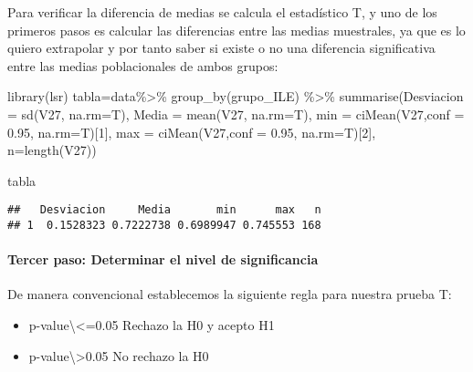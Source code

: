 \documentclass[
]{article}
\newenvironment{Shaded}{\begin{snugshade}}{\end{snugshade}}
\newcommand{\AttributeTok}[1]{\textcolor[rgb]{0.77,0.63,0.00}{#1}}
\newcommand{\DecValTok}[1]{\textcolor[rgb]{0.00,0.00,0.81}{#1}}
\newcommand{\FloatTok}[1]{\textcolor[rgb]{0.00,0.00,0.81}{#1}}
\newcommand{\FunctionTok}[1]{\textcolor[rgb]{0.00,0.00,0.00}{#1}}
\newcommand{\NormalTok}[1]{#1}
\newcommand{\OtherTok}[1]{\textcolor[rgb]{0.56,0.35,0.01}{#1}}
\newcommand{\SpecialCharTok}[1]{\textcolor[rgb]{0.00,0.00,0.00}{#1}}
\begin{document}
Para verificar la diferencia de medias se calcula el estadístico T, y
uno de los primeros pasos es calcular las diferencias entre las medias
muestrales, ya que es lo quiero extrapolar y por tanto saber si existe o
no una diferencia significativa entre las medias poblacionales de ambos
grupos:

\begin{Shaded}
\begin{Highlighting}[]
\FunctionTok{library}\NormalTok{(lsr)}
\NormalTok{tabla}\OtherTok{=}\NormalTok{data}\SpecialCharTok{\%\textgreater{}\%}
  \FunctionTok{group\_by}\NormalTok{(grupo\_ILE) }\SpecialCharTok{\%\textgreater{}\%}
\FunctionTok{summarise}\NormalTok{(}\AttributeTok{Desviacion =} \FunctionTok{sd}\NormalTok{(V27, }\AttributeTok{na.rm=}\NormalTok{T),}
          \AttributeTok{Media =} \FunctionTok{mean}\NormalTok{(V27, }\AttributeTok{na.rm=}\NormalTok{T),}
            \AttributeTok{min =} \FunctionTok{ciMean}\NormalTok{(V27,}\AttributeTok{conf =} \FloatTok{0.95}\NormalTok{, }\AttributeTok{na.rm=}\NormalTok{T)[}\DecValTok{1}\NormalTok{],}
            \AttributeTok{max =} \FunctionTok{ciMean}\NormalTok{(V27,}\AttributeTok{conf =} \FloatTok{0.95}\NormalTok{, }\AttributeTok{na.rm=}\NormalTok{T)[}\DecValTok{2}\NormalTok{],}
          \AttributeTok{n=}\FunctionTok{length}\NormalTok{(V27))}
            
\NormalTok{tabla}
\end{Highlighting}
\end{Shaded}

\begin{verbatim}
##   Desviacion     Media       min      max   n
## 1  0.1528323 0.7222738 0.6989947 0.745553 168
\end{verbatim}

\hypertarget{tercer-paso-determinar-el-nivel-de-significancia}{%
\paragraph{\texorpdfstring{\textbf{Tercer paso: Determinar el nivel de
significancia}}{Tercer paso: Determinar el nivel de significancia}}\label{tercer-paso-determinar-el-nivel-de-significancia}}

De manera convencional establecemos la siguiente regla para nuestra
prueba T:

\begin{itemize}
\item
  p-value\textbackslash\textless=0.05 Rechazo la H0 y acepto H1
\item
  p-value\textbackslash\textgreater0.05 No rechazo la H0
\end{itemize}
\end{document}
